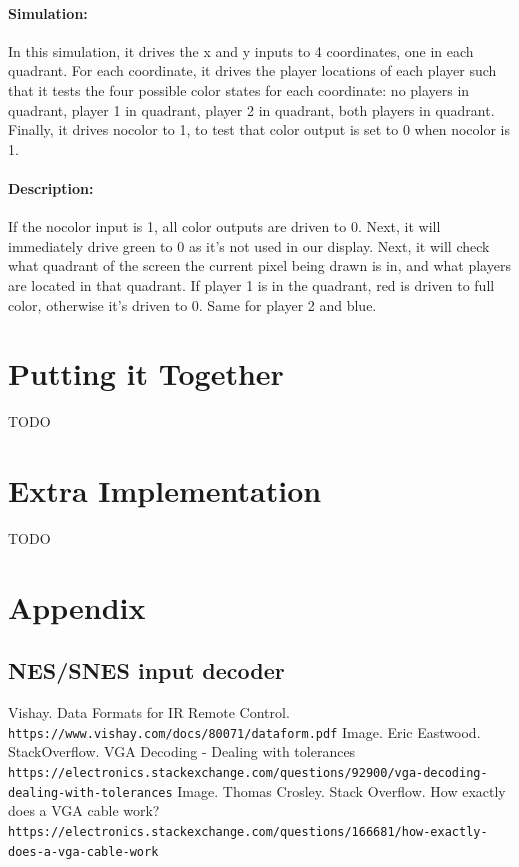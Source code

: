 \documentclass[]{article}
\begin{document}
\paragraph{Simulation:} In this simulation, it drives the x and y inputs to 4 coordinates, one in each quadrant.  For each coordinate, it drives the player locations of each player such that it tests the four possible color states for each coordinate: no players in quadrant, player 1 in quadrant, player 2 in quadrant, both players in quadrant.  Finally, it drives nocolor to 1, to test that color output is set to 0 when nocolor is 1.
\paragraph{Description:} If the nocolor input is 1, all color outputs are driven to 0.  Next, it will immediately drive green to 0 as it's not used in our display.  Next, it will check what quadrant of the screen the current pixel being drawn is in, and what players are located in that quadrant.  If player 1 is in the quadrant, red is driven to full color, otherwise it's driven to 0.  Same for player 2 and blue.

\section{Putting it Together}
TODO

\section{Extra Implementation}
TODO

\section{Appendix}
\subsection{NES/SNES input decoder}


\begin{thebibliography}{99}
    Vishay. Data Formats for IR Remote Control. 
    \\\texttt{https://www.vishay.com/docs/80071/dataform.pdf}
    Image. Eric Eastwood. StackOverflow.  VGA Decoding - Dealing with tolerances
    \\\texttt{https://electronics.stackexchange.com/questions/92900/vga-decoding-dealing-with-tolerances}
    Image. Thomas Crosley. Stack Overflow.  How exactly does a VGA cable work?
    \\\texttt{https://electronics.stackexchange.com/questions/166681/how-exactly-does-a-vga-cable-work}
\end{thebibliography}
\end{document}
